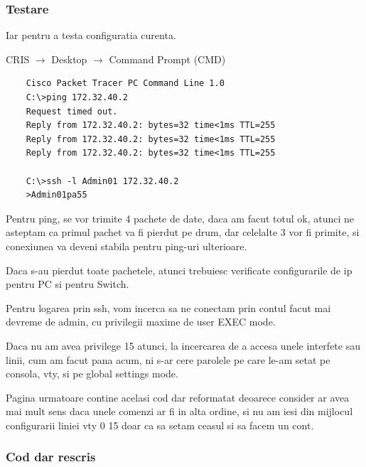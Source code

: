 \documentclass{article}
\begin{document}
\newpage
\subsubsection{Testare}
Iar pentru a testa configuratia curenta.

CRIS $\rightarrow$ Desktop $\rightarrow$  Command Prompt (CMD)

\begin{verbatim}
    Cisco Packet Tracer PC Command Line 1.0
    C:\>ping 172.32.40.2
    Request timed out.
    Reply from 172.32.40.2: bytes=32 time<1ms TTL=255
    Reply from 172.32.40.2: bytes=32 time<1ms TTL=255
    Reply from 172.32.40.2: bytes=32 time<1ms TTL=255

    C:\>ssh -l Admin01 172.32.40.2
    >Admin01pa55
\end{verbatim}


Pentru ping, se vor trimite 4 pachete de date, daca am facut totul ok, atunci ne asteptam ca primul pachet va fi pierdut pe drum, dar celelalte 3 vor fi primite, si conexiunea va deveni stabila pentru ping-uri ulterioare.

Daca s-au pierdut toate pachetele, atunci trebuiesc verificate configurarile de ip pentru PC si pentru Switch. 

Pentru logarea prin ssh, vom incerca sa ne conectam prin contul facut mai devreme de admin, cu privilegii maxime de user EXEC mode.

Daca nu am avea privilege 15 atunci, la incercarea de a accesa unele interfete sau linii, cum am facut pana acum, ni s-ar cere parolele pe care le-am setat pe consola, vty, si pe global settings mode.

Pagina urmatoare contine acelasi cod dar reformatat deoarece consider ar avea mai mult sens daca unele comenzi ar fi in alta ordine, si nu am iesi din mijlocul configurarii liniei vty 0 15 doar ca sa setam ceasul si sa facem un cont.
\newpage
\subsubsection{Cod dar rescris}
\end{document}
